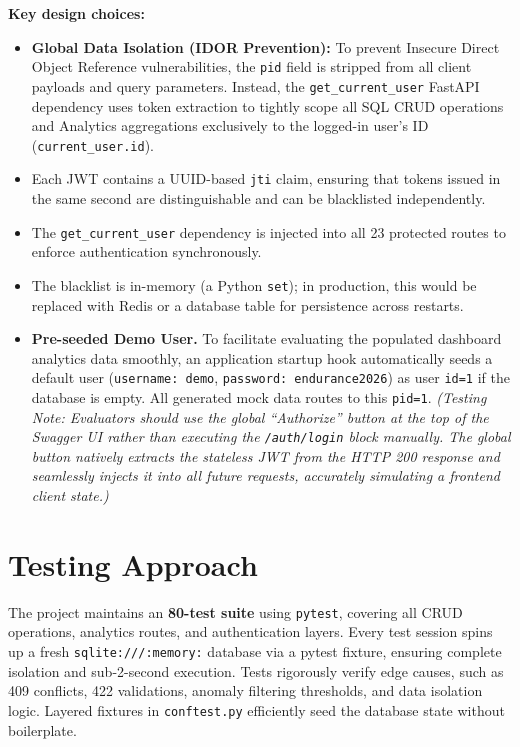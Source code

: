 \documentclass[10pt,a4paper]{article}
\begin{document}
\textbf{Key design choices:}
\begin{itemize}[leftmargin=1.5em]
  \item \textbf{Global Data Isolation (IDOR Prevention):} To prevent Insecure Direct Object Reference vulnerabilities, the \texttt{pid} field is stripped from all client payloads and query parameters. Instead, the \texttt{get\_current\_user} FastAPI dependency uses token extraction to tightly scope all SQL CRUD operations and Analytics aggregations exclusively to the logged-in user's ID (\texttt{current\_user.id}).
  \item Each JWT contains a UUID-based \texttt{jti} claim, ensuring that tokens issued in the same second are distinguishable and can be blacklisted independently.
  \item The \texttt{get\_current\_user} dependency is injected into all 23 protected routes to enforce authentication synchronously.
  \item The blacklist is in-memory (a Python \texttt{set}); in production, this would be replaced with Redis or a database table for persistence across restarts.
  \item \textbf{Pre-seeded Demo User.} To facilitate evaluating the populated dashboard analytics data smoothly, an application startup hook automatically seeds a default user (\texttt{username: demo}, \texttt{password: endurance2026}) as user \texttt{id=1} if the database is empty. All generated mock data routes to this \texttt{pid=1}. \textit{(Testing Note: Evaluators should use the global ``Authorize'' button at the top of the Swagger UI rather than executing the \texttt{/auth/login} block manually. The global button natively extracts the stateless JWT from the HTTP 200 response and seamlessly injects it into all future requests, accurately simulating a frontend client state.)}
\end{itemize}

\section{Testing Approach}

The project maintains an \textbf{80-test suite} using \texttt{pytest}, covering all CRUD operations, analytics routes, and authentication layers. Every test session spins up a fresh \texttt{sqlite:///:memory:} database via a pytest fixture, ensuring complete isolation and sub-2-second execution. Tests rigorously verify edge causes, such as 409 conflicts, 422 validations, anomaly filtering thresholds, and data isolation logic. Layered fixtures in \texttt{conftest.py} efficiently seed the database state without boilerplate.
\end{document}
